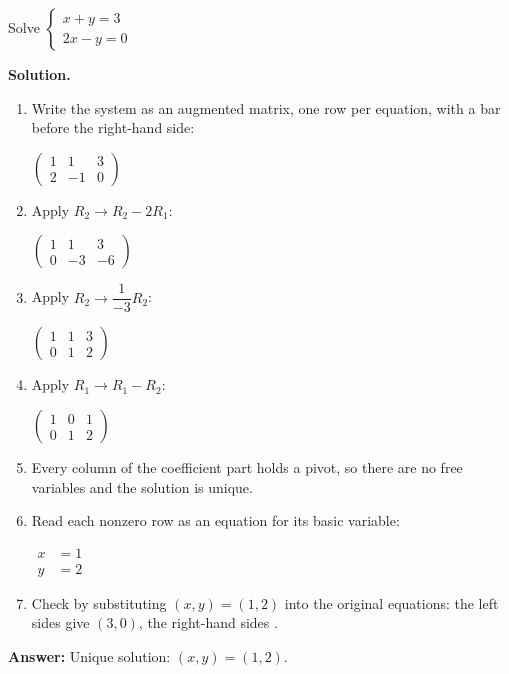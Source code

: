 \documentclass[11pt]{article}
\begin{document}
\begin{tcolorbox}[breakable,colback=white,colframe=ink!60,title={\bfseries Example 2 \textperiodcentered\ A system with a unique solution}]Solve $\begin{cases}x+y=3\\ 2x-y=0\end{cases}$
\par\smallskip
\textbf{Solution.} \begin{enumerate}[leftmargin=1.6em,itemsep=1pt,topsep=2pt,label=\arabic*.]\item Write the system as an augmented matrix, one row per equation, with a bar before the right-hand side:\par\smallskip $\displaystyle \left(\begin{array}{cc|c}1 & 1 & 3 \\ 2 & -1 & 0\end{array}\right)$
\item Apply $R_2\to R_2-2R_1$:\par\smallskip $\displaystyle \left(\begin{array}{cc|c}1 & 1 & 3 \\ 0 & -3 & -6\end{array}\right)$
\item Apply $R_2\to \dfrac{1}{-3} R_2$:\par\smallskip $\displaystyle \left(\begin{array}{cc|c}1 & 1 & 3 \\ 0 & 1 & 2\end{array}\right)$
\item Apply $R_1\to R_1-R_2$:\par\smallskip $\displaystyle \left(\begin{array}{cc|c}1 & 0 & 1 \\ 0 & 1 & 2\end{array}\right)$
\item Every column of the coefficient part holds a pivot, so there are no free variables and the solution is unique.
\item Read each nonzero row as an equation for its basic variable:\par\smallskip $\displaystyle\begin{aligned}x&=1\\ y&=2\end{aligned}$
\item Check by substituting $(x,y)=(1,2)$ into the original equations: the left sides give $(3,0)$, the right-hand sides \checkmark.
\end{enumerate}\textbf{Answer:} Unique solution: $(x,y)=(1,2)$.
\end{tcolorbox}
\end{document}
